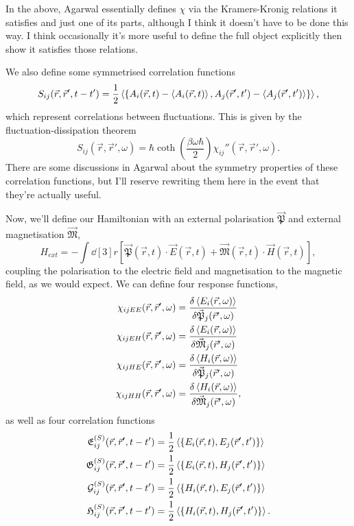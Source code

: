 \documentclass[../main.tex]{subfiles}
\newcommand{\polr}{\vec{\mathfrak{P}}}
\newcommand{\magn}{\vec{\mathfrak{M}}}
\newcommand{\ecorr}{\mathfrak{E}^{(S)}_{ij}}
\newcommand{\hcorr}{\mathfrak{H}^{(S)}_{ij}}
\newcommand{\mixcorr}{\mathfrak{G}^{(S)}_{ij}}
\newcommand{\mixcorrflip}{\mathfrak{\mathcal{G}}^{(S)}_{ij}}
\begin{document}
	In the above, Agarwal essentially defines $\chi$ via the Kramers-Kronig relations it satisfies and just one of its parts, although I think it doesn't have to be done this way.
	I think occasionally it's more useful to define the full object explicitly then show it satisfies those relations.

	We also define some symmetrised correlation functions
	\begin{equation}
		S_{ij}(\vec{r}, \vec{r}', t - t') = \frac12 \ev{\acomm{A_i(\vec{r}, t) - \ev{A_i(\vec{r}, t)}}{A_j(\vec{r}', t') - \ev{A_j(\vec{r}', t')}}},
	\end{equation}
	which represent correlations between fluctuations.
	This is given by the fluctuation-dissipation theorem
	\begin{equation}
		S_{ij}(\vec{r}, \vec{r}', \omega) = \hbar \coth(\frac{\beta \omega \hbar}{2}) \chi_{ij}''(\vec{r}, \vec{r}', \omega).
	\end{equation}
	There are some discussions in Agarwal about the symmetry properties of these correlation functions, but I'll reserve rewriting them here in the event that they're actually useful.

	Now, we'll define our Hamiltonian with an external polarisation $\polr$ and external magnetisation $\magn$,
	\begin{equation}
		H_{ext} = - \int \dd[3]{r} \left[ \polr(\vec{r}, t) \cdot \vec{E}(\vec{r}, t) + \magn(\vec{r}, t) \cdot \vec{H}(\vec{r}, t) \right],
	\end{equation}
	coupling the polarisation to the electric field and magnetisation to the magnetic field, as we would expect.
	We can define four response functions,
	\begin{align}
		\chi_{ijEE}(\vec{r}, \vec{r}', \omega) &= \fdv{\ev{E_i(\vec{r}, \omega)}}{\polr_j(\vec{r}', \omega)} \\
		\chi_{ijEH}(\vec{r}, \vec{r}', \omega) &= \fdv{\ev{E_i(\vec{r}, \omega)}}{\magn_j(\vec{r}', \omega)} \\
		\chi_{ijHE}(\vec{r}, \vec{r}', \omega) &= \fdv{\ev{H_i(\vec{r}, \omega)}}{\polr_j(\vec{r}', \omega)} \\
		\chi_{ijHH}(\vec{r}, \vec{r}', \omega) &= \fdv{\ev{H_i(\vec{r}, \omega)}}{\magn_j(\vec{r}', \omega)},
	\end{align}
	as well as four correlation functions
	\begin{align}
		\ecorr      (\vec{r}, \vec{r}', t - t') &= \frac12 \ev{\acomm{E_i(\vec{r}, t)}{E_j(\vec{r}', t')}} \\
		\mixcorr    (\vec{r}, \vec{r}', t - t') &= \frac12 \ev{\acomm{E_i(\vec{r}, t)}{H_j(\vec{r}', t')}} \\
		\mixcorrflip(\vec{r}, \vec{r}', t - t') &= \frac12 \ev{\acomm{H_i(\vec{r}, t)}{E_j(\vec{r}', t')}} \\
		\hcorr      (\vec{r}, \vec{r}', t - t') &= \frac12 \ev{\acomm{H_i(\vec{r}, t)}{H_j(\vec{r}', t')}}.
	\end{align}
\end{document}
